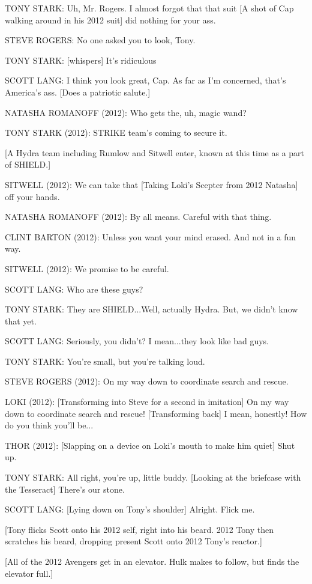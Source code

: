 TONY STARK: Uh, Mr. Rogers. I almost forgot that that suit [A shot of Cap walking around in his 2012 suit] did nothing for your ass.

STEVE ROGERS: No one asked you to look, Tony.

TONY STARK: [whispers] It's ridiculous

SCOTT LANG: I think you look great, Cap. As far as I'm concerned, that's America's ass. [Does a patriotic salute.]

NATASHA ROMANOFF (2012): Who gets the, uh, magic wand?

TONY STARK (2012): STRIKE team's coming to secure it.

[A Hydra team including Rumlow and Sitwell enter, known at this time as a part of SHIELD.]

SITWELL (2012): We can take that [Taking Loki's Scepter from 2012 Natasha] off your hands.

NATASHA ROMANOFF (2012): By all means. Careful with that thing.

CLINT BARTON (2012): Unless you want your mind erased. And not in a fun way.

SITWELL (2012): We promise to be careful.

SCOTT LANG: Who are these guys?

TONY STARK: They are SHIELD...Well, actually Hydra. But, we didn't know that yet.

SCOTT LANG: Seriously, you didn't? I mean...they look like bad guys.

TONY STARK: You're small, but you're talking loud.

STEVE ROGERS (2012): On my way down to coordinate search and rescue.

LOKI (2012): [Transforming into Steve for a second in imitation] On my way down to coordinate search and rescue! [Transforming back] I mean, honestly! How do you think you'll be...

THOR (2012): [Slapping on a device on Loki's mouth to make him quiet] Shut up.

TONY STARK: All right, you're up, little buddy. [Looking at the briefcase with the Tesseract] There's our stone.

SCOTT LANG: [Lying down on Tony's shoulder] Alright. Flick me.

[Tony flicks Scott onto his 2012 self, right into his beard. 2012 Tony then scratches his beard, dropping present Scott onto 2012 Tony's reactor.]

[All of the 2012 Avengers get in an elevator. Hulk makes to follow, but finds the elevator full.]


